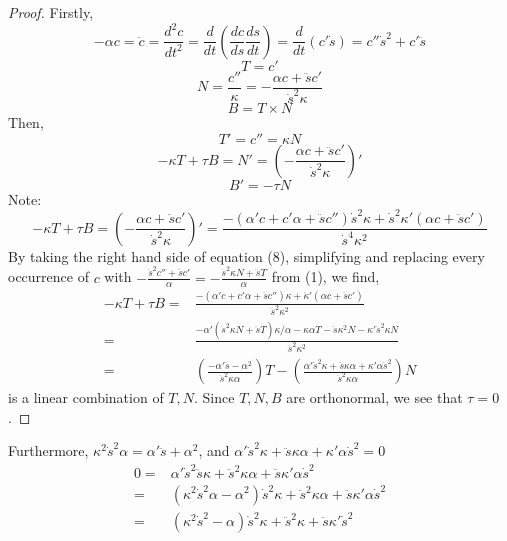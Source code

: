 \documentclass[12pt]{amsart}
\begin{document}
\begin{proof}
Firstly,
\begin{equation}
	-\alpha c=\ddot c=\frac{d^2c}{dt^2}=\frac{d}{dt}\left(\frac{dc}{ds}\frac{ds}{dt}\right)=\frac{d}{dt}\left(c'\dot s\right)=c''\dot s^2+c'\ddot s%
\end{equation}
\begin{equation}
	T=c'
\end{equation}
\begin{equation}
	N=\frac{c''}{\kappa}=-\frac{\alpha c+\ddot sc'}{\dot s^2\kappa}
\end{equation}
\begin{equation}
	B=T\times N
\end{equation}
Then,
\begin{equation}
	T'=c''=\kappa N
\end{equation}
\begin{equation}
	-\kappa T+\tau B=N'=\left(-\frac{\alpha c+\ddot sc'}{\dot s^2\kappa}\right)'
\end{equation}
\begin{equation}
	B'=-\tau N
\end{equation}
Note: 
\begin{equation}
	-\kappa T+\tau B=\left(-\frac{\alpha c+\ddot sc'}{\dot s^2\kappa}\right)'=\frac{-(\alpha'c+c'\alpha+\ddot sc'')\dot s^2\kappa+\dot s^2\kappa'(\alpha c+\ddot sc')}{\dot s^4\kappa^2}
\end{equation}
By taking the right hand side of equation (8), simplifying and replacing every occurrence of $c$ with $-\frac{\dot s^2c''+\ddot sc'}{\alpha}=-\frac{\dot s^2\kappa N+\ddot sT}{\alpha}$ from (1), we find, 
\begin{align*}
	-\kappa T+\tau B=&\frac{-(\alpha'c+c'\alpha+\ddot sc'')\kappa+\dot\kappa'(\alpha c+\ddot sc')}{\dot s^2\kappa^2}
	\\=&\frac{-\alpha'(\dot s^2\kappa N+\ddot sT)\kappa/\alpha-\kappa\alpha T-\ddot s\kappa^2N-\kappa'\dot s^2\kappa N}{\dot s^2\kappa^2}
	\\=&\left(\frac{-\alpha'\ddot s-\alpha^2}{\dot s^2\kappa\alpha}\right)T-\left(\frac{\alpha'\dot s^2\kappa+\ddot s\kappa\alpha+\kappa'\alpha\dot s^2}{\dot s^2\kappa\alpha}\right)N
\end{align*}
is a linear combination of $T, N$. Since $T,N,B$ are orthonormal, we see that $\tau=0$.
\end{proof}
Furthermore, $\kappa^2\dot s^2\alpha=\alpha'\ddot s+\alpha^2$, and $\alpha'\dot s^2\kappa+\ddot s\kappa\alpha+\kappa'\alpha\dot s^2=0$
\begin{align*}
	0=&\alpha'\dot s^2\ddot s\kappa+\ddot s^2\kappa\alpha+\ddot s\kappa'\alpha\dot s^2
	\\=&(\kappa^2\dot s^2\alpha-\alpha^2)\dot s^2\kappa+\ddot s^2\kappa\alpha+\ddot s\kappa'\alpha\dot s^2
	\\=&(\kappa^2\dot s^2-\alpha)\dot s^2\kappa+\ddot s^2\kappa+\ddot s\kappa'\dot s^2
\end{align*}
\end{document}
